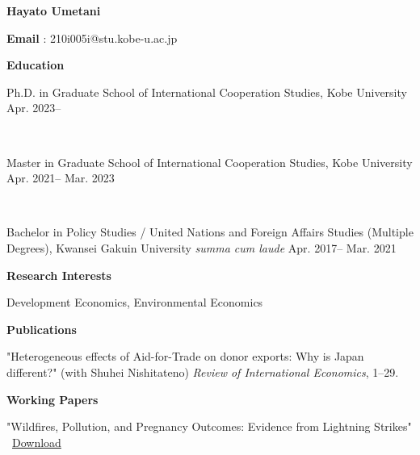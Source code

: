 \documentclass{article}
\begin{document}
\onehalfspacing

\begin{center}
  \textbf{{\Large Hayato Umetani}}

  \textbf{Email} : 210i005i@stu.kobe-u.ac.jp

\end{center}

\hrulefill

\begin{flushleft}
  \textbf{\large{Education}}
\end{flushleft}

Ph.D. in Graduate School of International Cooperation Studies, Kobe University \hspace{\fill} Apr. 2023--

\ \

Master in Graduate School of International Cooperation Studies, Kobe University \hspace{\fill} Apr. 2021-- Mar. 2023

\ \

Bachelor in Policy Studies / United Nations and Foreign Affairs Studies (Multiple Degrees), Kwansei Gakuin University \textit{summa cum laude} \hspace{\fill} Apr. 2017-- Mar. 2021



\hrulefill

\begin{flushleft}
  \textbf{\large{Research Interests}}
\end{flushleft}

Development Economics, Environmental Economics

\hrulefill

\begin{flushleft}
  \textbf{\large{Publications}}
\end{flushleft}

"Heterogeneous effects of Aid-for-Trade on donor exports: Why is Japan different?" (with Shuhei Nishitateno) \textit{Review of International Economics}, 1–29.

\hrulefill

\begin{flushleft}
  \textbf{\large{Working Papers}}
\end{flushleft}

"Wildfires, Pollution, and Pregnancy Outcomes: Evidence from Lightning Strikes" \ \href{https://dx.doi.org/10.2139/ssrn.4833440}{Download}

\hrulefill
\end{document}
